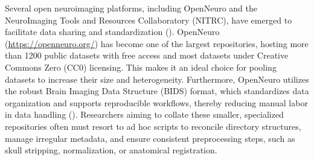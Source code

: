 Several open neuroimaging platforms, including OpenNeuro and the NeuroImaging Tools and Resources Collaboratory (NITRC),
have emerged to facilitate data sharing and standardization (\cite{markiewicz2021openneuro, buccigrossi2008neuroimaging}).
OpenNeuro (\url{https://openneuro.org/}) has become one of the largest repositories, hosting more than 1200 public 
datasets with free access and most datasets under Creative Commons Zero (CC0) licensing. This makes it an ideal choice for 
pooling datasets to increase their size and heterogeneity. 
Furthermore, OpenNeuro utilizes the robust Brain Imaging Data Structure (BIDS) format, which standardizes data 
organization and supports reproducible workflows, thereby reducing manual labor in data handling (\cite{markiewicz2021openneuro}). 
Researchers aiming to collate these smaller, specialized repositories often must 
resort to ad hoc scripts to reconcile directory structures, manage irregular metadata, and ensure consistent preprocessing 
steps, such as skull stripping, normalization, or anatomical registration.


